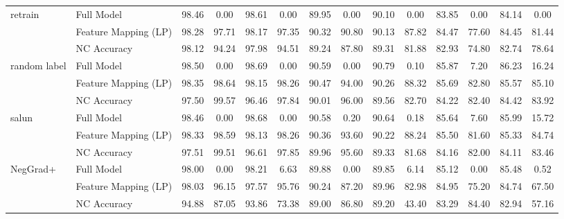 \begin{table}[t]
{\begin{tabular}{l l cc cc cc cc cc cc}
 \midrule
\multirow{3}{*}{retrain} & Full Model & 98.46 & 0.00 & 98.61 & 0.00 & 89.95 & 0.00 & 90.10 & 0.00 & 83.85 & 0.00 & 84.14 & 0.00 \\
 & Feature Mapping (LP) & 98.28 & 97.71 & 98.17 & 97.35 & 90.32 & 90.80 & 90.13 & 87.82 & 84.47 & 77.60 & 84.45 & 81.44 \\
 & NC Accuracy & 98.12 & 94.24 & 97.98 & 94.51 & 89.24 & 87.80 & 89.31 & 81.88 & 82.93 & 74.80 & 82.74 & 78.64 \\

 
\midrule
\multirow{3}{*}{random label} & Full Model & 98.50 & 0.00 & 98.69 & 0.00 & 90.59 & 0.00 & 90.79 & 0.10 & 85.87 & 7.20 & 86.23 & 16.24 \\
 & Feature Mapping (LP) & 98.35 & 98.64 & 98.15 & 98.26 & 90.47 & 94.00 & 90.26 & 88.32 & 85.69 & 82.80 & 85.57 & 85.10 \\
 & NC Accuracy & 97.50 & 99.57 & 96.46 & 97.84 & 90.01 & 96.00 & 89.56 & 82.70 & 84.22 & 82.40 & 84.42 & 83.92 \\
\midrule
\multirow{3}{*}{salun} & Full Model & 98.46 & 0.00 & 98.68 & 0.00 & 90.58 & 0.20 & 90.64 & 0.18 & 85.64 & 7.60 & 85.99 & 15.72 \\
 & Feature Mapping (LP) & 98.33 & 98.59 & 98.13 & 98.26 & 90.36 & 93.60 & 90.22 & 88.24 & 85.50 & 81.60 & 85.33 & 84.74 \\
 & NC Accuracy & 97.51 & 99.51 & 96.61 & 97.85 & 89.96 & 95.60 & 89.33 & 81.68 & 84.16 & 82.00 & 84.11 & 83.46 \\

\midrule
\multirow{3}{*}{NegGrad+} & Full Model & 98.00 & 0.00 & 98.21 & 6.63 & 89.88 & 0.00 & 89.85 & 6.14 & 85.12 & 0.00 & 85.48 & 0.52 \\
 & Feature Mapping (LP) & 98.03 & 96.15 & 97.57 & 95.76 & 90.24 & 87.20 & 89.96 & 82.98 & 84.95 & 75.20 & 84.74 & 67.50 \\
 & NC Accuracy & 94.88 & 87.05 & 93.86 & 73.38 & 89.00 & 86.80 & 89.20 & 43.40 & 83.29 & 84.40 & 82.94 & 57.16 \\

\bottomrule
\end{tabular}
}
\end{table}

\endgroup
